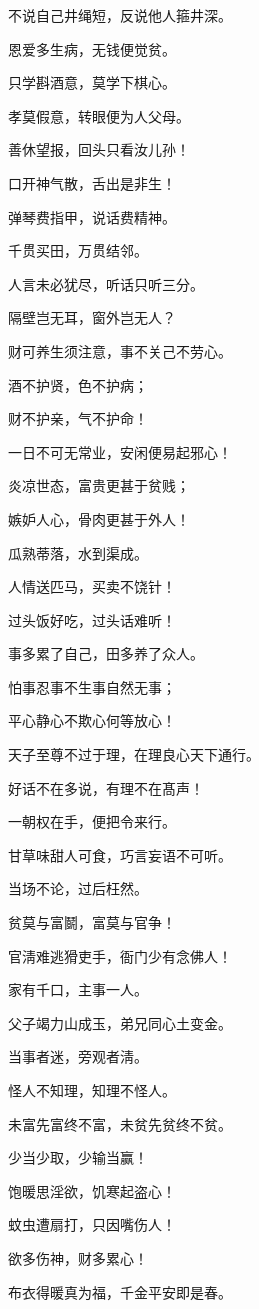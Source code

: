 \documentclass[12pt,oneside]{book}
\begin{document}
不说自己井绳短，反说他人箍井深。

恩爱多生病，无钱便觉贫。

只学斟酒意，莫学下棋心。

孝莫假意，转眼便为人父母。

善休望报，回头只看汝儿孙！

口开神气散，舌出是非生！

弹琴费指甲，说话费精神。

千贯买田，万贯结邻。

人言未必犹尽，听话只听三分。

隔壁岂无耳，窗外岂无人？

财可养生须注意，事不关己不劳心。

酒不护贤，色不护病；

财不护亲，气不护命！

一日不可无常业，安闲便易起邪心！

炎凉世态，富贵更甚于贫贱；

嫉妒人心，骨肉更甚于外人！

瓜熟蒂落，水到渠成。

人情送匹马，买卖不饶针！

过头饭好吃，过头话难听！

事多累了自己，田多养了众人。

怕事忍事不生事自然无事；

平心静心不欺心何等放心！

天子至尊不过于理，在理良心天下通行。

好话不在多说，有理不在髙声！

一朝权在手，便把令来行。

甘草味甜人可食，巧言妄语不可听。

当场不论，过后枉然。

贫莫与富鬬，富莫与官争！

官淸难逃猾吏手，衙门少有念佛人！

家有千口，主事一人。

父子竭力山成玉，弟兄同心土变金。

当事者迷，旁观者淸。

怪人不知理，知理不怪人。

未富先富终不富，未贫先贫终不贫。

少当少取，少输当赢！

饱暖思淫欲，饥寒起盗心！

蚊虫遭扇打，只因嘴伤人！

欲多伤神，财多累心！

布衣得暖真为福，千金平安即是春。
\end{document}
